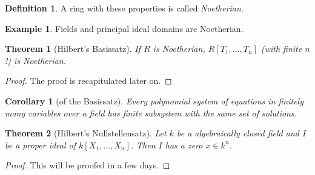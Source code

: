 \documentclass[DIV=14,parskip=half]{scrartcl}
\newtheorem{thm}{Theorem}[subsection]
\newtheorem{cor}{Corollary}[subsection]
\theoremstyle{definition}
\newtheorem{defi}{Definition}[subsection]
\newtheorem{example}{Example}[subsection]
\begin{document}
\begin{defi}\label{def:Noetherian}
 A ring with these properties is called \emph{Noetherian}.
\end{defi}
\begin{example}
 Fields and principal ideal domains are Noetherian. 
\end{example}
\begin{thm}[Hilbert's Basissatz]\label{thm:Basissatz}
 If $R$ is Noetherian, $R[T_1,\ldots,T_n]$ (with finite $n$!) is Noetherian.
\end{thm}
\begin{proof}
 The proof is recapitulated later on.
\end{proof}
\begin{cor}[of the Basissatz]
 Every polynomial system of equations in finitely many variables over a field has finite subsystem with the same set of solutions.
\end{cor}
\begin{thm}[Hilbert's Nullstellensatz] \label{thm:Nullstellensatz}
 Let $k$ be a algebraically closed field and $I$ be a proper ideal of $k[X_1,\ldots,X_n]$. Then $I$ has a zero $x\in k^n$.
\end{thm}
\begin{proof}
 This will be proofed in a few days.
\end{proof}
\end{document}

